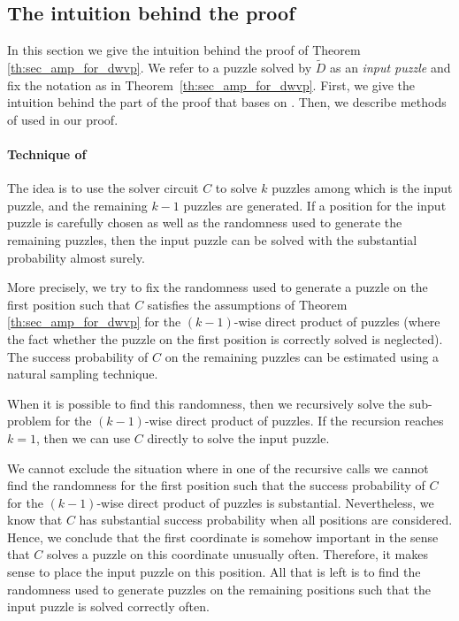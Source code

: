 %
\subsection{The intuition behind the proof}
\label{section:intuition}
In this section we give the intuition behind the proof of Theorem \ref{th:sec_amp_for_dwvp}.
We refer to a puzzle solved by $\widetilde{D}$ as an \textit{input puzzle} and fix the notation as in Theorem~\ref{th:sec_amp_for_dwvp}.
First, we give the intuition behind the part of the proof that bases on \cite{canetti2005hardness, holenstein2011general}.
Then, we describe methods of \cite{dodis2009security} used in our proof.

\paragraph{Technique of \cite{canetti2005hardness, holenstein2011general}}
The idea is to use the solver circuit $C$ to solve $k$ puzzles among which is the input puzzle, and
the remaining $k\!-\!1$ puzzles are generated.
If a position for the input puzzle is carefully chosen as well as the randomness used to generate the remaining puzzles,
then the input puzzle can be solved with the substantial probability almost surely.

More precisely, we try to fix the randomness used to generate a puzzle on the first position such that $C$
satisfies the assumptions of Theorem \ref{th:sec_amp_for_dwvp}
for the $(k\!-\!1)$-wise direct product of puzzles (where the fact whether the puzzle on the first position is correctly solved is neglected).
The success probability of $C$ on the remaining puzzles can be estimated using a natural sampling technique.

When it is possible to find this randomness, then we recursively solve the sub-problem for the $(k\!-\!1)$-wise direct product of puzzles.
If the recursion reaches $k=1$, then we can use $C$ directly to solve the input puzzle.

We cannot exclude the situation where in one of the recursive calls we cannot
find the randomness for the first position such that the success probability of $C$ for the $(k\!-\!1)$-wise direct product of puzzles is substantial.
Nevertheless, we know that $C$ has substantial success probability when all positions are considered.
Hence, we conclude that the first coordinate is somehow important in the sense that $C$ solves a puzzle on this coordinate unusually often.
Therefore, it makes sense to place the input puzzle on this position.
All that is left is to find the randomness used to generate puzzles on the remaining positions
such that the input puzzle is solved correctly often.

